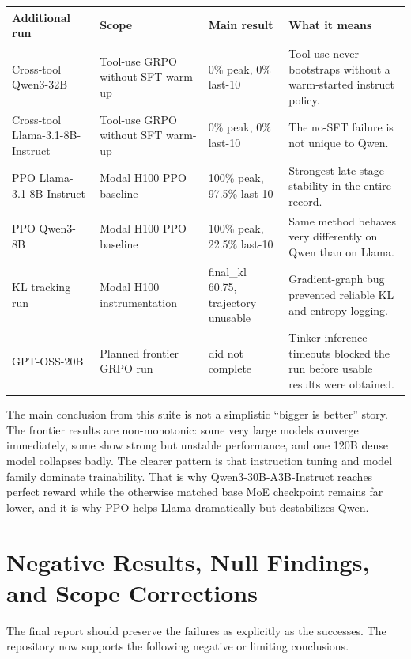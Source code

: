 \small
\begin{center}
\begin{tabularx}{\textwidth}{L{3.2cm}L{2.6cm}L{2.0cm}Y}
\toprule
Additional run & Scope & Main result & What it means \\
\midrule
Cross-tool Qwen3-32B & Tool-use GRPO without SFT warm-up & 0\% peak, 0\% last-10 & Tool-use never bootstraps without a warm-started instruct policy. \\
Cross-tool Llama-3.1-8B-Instruct & Tool-use GRPO without SFT warm-up & 0\% peak, 0\% last-10 & The no-SFT failure is not unique to Qwen. \\
PPO Llama-3.1-8B-Instruct & Modal H100 PPO baseline & 100\% peak, 97.5\% last-10 & Strongest late-stage stability in the entire record. \\
PPO Qwen3-8B & Modal H100 PPO baseline & 100\% peak, 22.5\% last-10 & Same method behaves very differently on Qwen than on Llama. \\
KL tracking run & Modal H100 instrumentation & final\_kl 60.75, trajectory unusable & Gradient-graph bug prevented reliable KL and entropy logging. \\
GPT-OSS-20B & Planned frontier GRPO run & did not complete & Tinker inference timeouts blocked the run before usable results were obtained. \\
\bottomrule
\end{tabularx}
\end{center}
\normalsize

The main conclusion from this suite is not a simplistic ``bigger is better''
story. The frontier results are non-monotonic: some very large models converge
immediately, some show strong but unstable performance, and one 120B dense
model collapses badly. The clearer pattern is that instruction tuning and model
family dominate trainability. That is why Qwen3-30B-A3B-Instruct reaches perfect
reward while the otherwise matched base MoE checkpoint remains far lower, and it
is why PPO helps Llama dramatically but destabilizes Qwen.

\section*{Negative Results, Null Findings, and Scope Corrections}

The final report should preserve the failures as explicitly as the successes.
The repository now supports the following negative or limiting conclusions.

